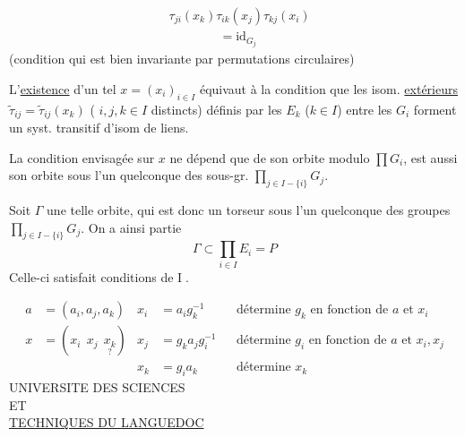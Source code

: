 \[
\begin{aligned}
&\tau_{ji}(x_k)\tau_{ik}(x_j)\tau_{kj}(x_i)\\
&\hspace{4em}=\mathrm{id}_{G_j}
\end{aligned}
\]
(condition qui est bien invariante par permutations circulaires)

L'\uline{existence} d'un tel $x=(x_i)_{i\in I}$ équivaut à la condition que les isom. \uline{extérieurs} $\widetilde\tau_{ij}=\widetilde\tau_{ij}(x_k)$ ( $i,j,k\in I$ distincts) définis par les $E_k$ ($k\in I$) entre les $G_i$ forment un syst. transitif d'isom de liens.

La condition envisagée sur $x$ ne dépend que de son orbite modulo $\prod G_i$,  est aussi son orbite sous l'un quelconque des sous-gr. $\prod_{j\in I-\{i\}}G_j$.

Soit $\Gamma$ une telle orbite, qui est donc un torseur sous l'un quelconque des  groupes $\prod_{j\in I-\{i\}}G_j$. On a ainsi   partie
\[
\Gamma\subset\prod_{i\in I} E_i=P
\]
Celle-ci satisfait  conditions de \textcircled{I}.

\[
\begin{aligned}
a&=(a_i,a_j,a_k)&x_i&=a_i g_k^{-1}& &\text{détermine }g_k\text{ en fonction de }a\text{ et }x_i\\
x&=(x_i\ \ x_j\ \ \underset{?}{x_k})&x_j&=g_k a_j g_i^{-1}& &\text{détermine }g_i\text{ en fonction de }a\text{ et }x_i,x_j\\
&&x_k&=g_i a_k&&\text{détermine }x_k
\end{aligned}
\]
UNIVERSITE DES SCIENCES\\
ET\\
\uline{TECHNIQUES DU LANGUEDOC}\\

